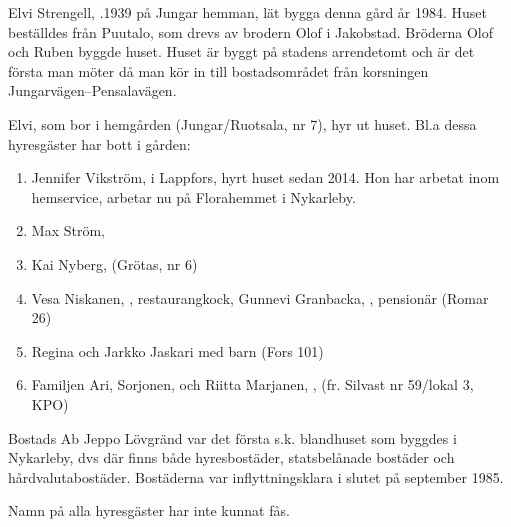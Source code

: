 %
Elvi Strengell, .1939 på Jungar hemman, lät bygga denna gård år 1984. Huset beställdes från Puutalo, som drevs av brodern Olof i Jakobstad. Bröderna Olof och Ruben byggde huset. Huset är byggt på stadens arrendetomt och är det första man möter då man kör in till bostadsområdet från korsningen Jungarvägen--Pensalavägen.

Elvi, som bor i hemgården (Jungar/Ruotsala, nr 7), hyr ut huset. Bl.a dessa hyresgäster har bott i gården:
\begin{enumerate}
  \item Jennifer Vikström,  i Lappfors, hyrt huset sedan 2014. Hon har arbetat inom hemservice, arbetar nu på Florahemmet i Nykarleby.
  \item Max Ström, 
  \item Kai Nyberg,  (Grötas, nr 6)
  \item Vesa Niskanen, , restaurangkock, Gunnevi Granbacka, , pensionär (Romar 26)
  \item Regina  och Jarkko Jaskari med barn (Fors 101)
  \item Familjen Ari, Sorjonen,  och Riitta Marjanen, , (fr. Silvast nr 59/lokal 3, KPO)
\end{enumerate}



%



Bostads Ab Jeppo Lövgränd var det första s.k. blandhuset som byggdes i Nykarleby, dvs där finns både hyresbostäder, statsbelånade bostäder och hårdvalutabostäder. Bostäderna var inflyttningsklara i slutet på september 1985.

Namn på alla hyresgäster har inte kunnat fås.\jhvspace{}

